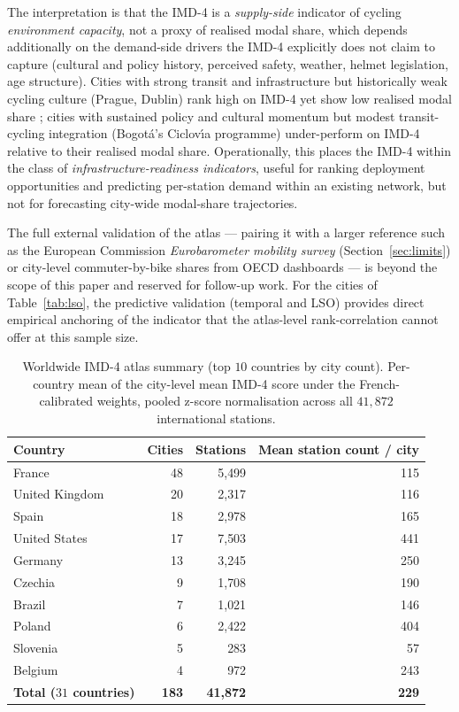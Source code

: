 \documentclass[11pt,a4paper]{article}
\begin{document}
The interpretation is that the IMD-4 is a \emph{supply-side}
indicator of cycling \emph{environment capacity}, not a proxy of
realised modal share, which depends additionally on the
demand-side drivers the IMD-4 explicitly does not claim to
capture (cultural and policy history, perceived safety,
weather, helmet legislation, age structure).  Cities with strong
transit and infrastructure but historically weak cycling culture
(Prague, Dublin) rank high on IMD-4 yet show low realised modal
share ; cities with sustained policy and cultural momentum but
modest transit-cycling integration (Bogot\'a's Ciclov\'\i a
programme) under-perform on IMD-4 relative to their realised
modal share.  Operationally, this places the IMD-4 within the
class of \emph{infrastructure-readiness indicators}, useful for
ranking deployment opportunities and predicting per-station
demand within an existing network, but not for forecasting
city-wide modal-share trajectories.

The full external validation of the atlas — pairing it with a
larger reference such as the European Commission
\emph{Eurobarometer mobility survey} (Section~\ref{sec:limits})
or city-level commuter-by-bike shares from OECD dashboards — is
beyond the scope of this paper and reserved for follow-up work.
For the cities of Table~\ref{tab:lso}, the predictive validation
(temporal and LSO) provides direct empirical anchoring of the
indicator that the atlas-level rank-correlation cannot offer at
this sample size.

\begin{table}[H]
\centering
\caption{Worldwide IMD-4 atlas summary (top $10$ countries by
city count).  Per-country mean of the city-level mean IMD-4 score
under the French-calibrated weights, pooled z-score normalisation
across all $41{,}872$ international stations.}
\label{tab:world-atlas-summary}
\small
\begin{tabular}{@{}lrrr@{}}
\toprule
Country & Cities & Stations & Mean station count / city \\
\midrule
France          & 48 & 5{,}499 & 115 \\
United Kingdom  & 20 & 2{,}317 & 116 \\
Spain           & 18 & 2{,}978 & 165 \\
United States   & 17 & 7{,}503 & 441 \\
Germany         & 13 & 3{,}245 & 250 \\
Czechia         & 9  & 1{,}708 & 190 \\
Brazil          & 7  & 1{,}021 & 146 \\
Poland          & 6  & 2{,}422 & 404 \\
Slovenia        & 5  & 283     & 57  \\
Belgium         & 4  & 972     & 243 \\
\midrule
\textbf{Total ($31$ countries)} & \textbf{183} & \textbf{41{,}872} & \textbf{229} \\
\bottomrule
\end{tabular}
\end{table}
\end{document}
